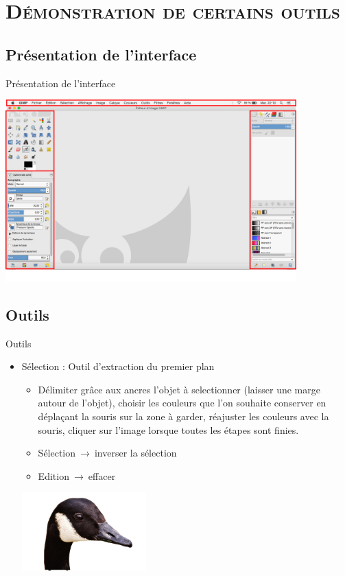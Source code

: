 \documentclass[xcolor=x11names,compress]{beamer}
\renewcommand{\(}{\begin{columns}}
\renewcommand{\)}{\end{columns}}
\newcommand{\<}[1]{\begin{column}{#1}}
\renewcommand{\>}{\end{column}}
\begin{document}
\section{\scshape Démonstration de certains outils}
\subsection{Présentation de l’interface}
\begin{frame}{Présentation de l’interface}

	\includegraphics[height=7cm]{gimp}

\end{frame}


\subsection{Outils}
\begin{frame}{Outils}
\begin{itemize}
\item Sélection : Outil d'extraction du premier plan\\ 
\begin{itemize}
\item Délimiter grâce aux ancres l'objet à selectionner (laisser une marge autour de l'objet), choisir les couleurs que l'on souhaite conserver en déplaçant la souris sur la zone à garder, réajuster les couleurs avec la souris, cliquer sur l'image lorsque toutes les étapes sont finies.\\
\item Sélection$\ \to\ $inverser la sélection\\
\item Edition$\ \to\ $effacer\\
\end{itemize}
\begin{center}
\includegraphics[height=3cm]{canard}
\end{center}
\end{itemize}
\end{frame}
\end{document}
